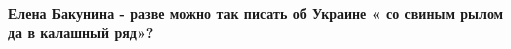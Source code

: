  
 
 
 
 
\paragraph{Елена Бакунина - разве можно так писать об Украине « со свиным рылом да в калашный ряд»?}
\label{sec:03_10_2021.fb.zaharova_maria.mid_rf.1.zelenskii_politika_naglost.cmt.1.bakunina}

